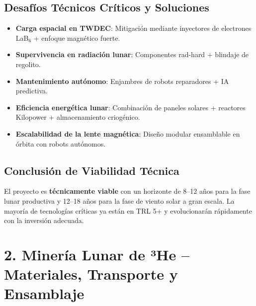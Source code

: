 \documentclass[11pt,a4paper]{article}
\begin{document}
\subsection{Desafíos Técnicos Críticos y Soluciones}
\begin{itemize}
\item \textbf{Carga espacial en TWDEC}: Mitigación mediante inyectores de electrones LaB$_6$ + enfoque magnético fuerte.
\item \textbf{Supervivencia en radiación lunar}: Componentes rad-hard + blindaje de regolito.
\item \textbf{Mantenimiento autónomo}: Enjambres de robots reparadores + IA predictiva.
\item \textbf{Eficiencia energética lunar}: Combinación de paneles solares + reactores Kilopower + almacenamiento criogénico.
\item \textbf{Escalabilidad de la lente magnética}: Diseño modular ensamblable en órbita con robots autónomos.
\end{itemize}
\subsection{Conclusión de Viabilidad Técnica}
El proyecto es \textbf{técnicamente viable} con un horizonte de 8--12 años para la fase lunar productiva y 12--18 años para la fase de viento solar a gran escala. La mayoría de tecnologías críticas ya están en TRL 5+ y evolucionarán rápidamente con la inversión adecuada.
\section{2. Minería Lunar de ³He – Materiales, Transporte y Ensamblaje}
\end{document}
